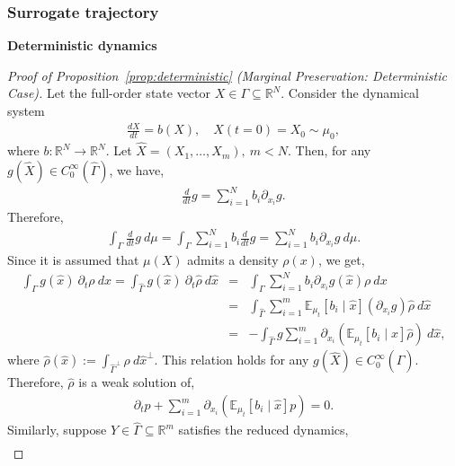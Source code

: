 \documentclass[11pt, a4paper, oneside, reqno]{amsart}
\begin{document}
\subsubsection{Surrogate trajectory}
\noindent\textbf{Deterministic dynamics}\label{app:proof x ode}

\begin{proof}[Proof of Proposition~\ref{prop:deterministic} (Marginal Preservation: Deterministic Case)]
    Let the full-order state vector $X\in\Gamma \subseteq \mathbb{R}^N$. Consider the dynamical system 
    \begin{eqnarray}
        \frac{dX}{dt} = b(X), \quad X(t=0) = X_0 \sim \mu_0,
    \end{eqnarray}
    where $b:\mathbb{R}^N\to\mathbb{R}^N$. Let $\hat{X}=(X_1,\dots,X_m), \ m<N$.
    Then, for any $g(\hat{X})\in C_0^\infty(\hat{\Gamma})$, we have,
    \begin{eqnarray}
        \frac{d}{dt}g = \sum_{i=1}^N b_i\partial_{x_i}g.
    \end{eqnarray}
    Therefore,
    \begin{eqnarray}
        \int_\Gamma \frac{d}{dt}g \ d\mu = \int_\Gamma \sum_{i=1}^N b_i        \frac{d}{dt}g = \sum_{i=1}^N b_i\partial_{x_i}g \ d\mu.
    \end{eqnarray}
    Since it is assumed that $\mu(X)$ admits a density $\rho(x)$, we get,
    \begin{eqnarray}
        \int_\Gamma g(\hat{x}) \ \partial_t\rho \ dx =  \int_{\hat{\Gamma}} g(\hat{x}) \ \partial_t\hat{\rho} \ d\hat{x} &=& \int_\Gamma \sum_{i=1}^N b_i\partial_{x_i}g(\hat{x}) \rho \ dx\nonumber\\
        &=&\int_{\hat{\Gamma}} \sum_{i=1}^m\mathbb{E}_{\mu_t}[b_i\mid \hat{x}] (\partial_{x_i}g) \hat{\rho}\ d\hat{x}\nonumber\\
        &=& -\int_{\hat{\Gamma}} g \sum_{i=1}^m\partial_{x_i}(\mathbb{E}_{\mu_t}[b_i\mid \hat{x}] \hat{\rho})\ d\hat{x},
    \end{eqnarray}
    where $\hat{\rho}(\hat{x}):=\int_{\hat{\Gamma}^\perp}\rho\ d\hat{x}^\perp$. This relation holds for any $g(\hat{X})\in C_0^\infty(\hat{\Gamma})$. Therefore, $\hat{\rho}$ is a weak solution of, 
    \begin{eqnarray}\label{eq:proba flow reference}
        \partial_tp+ \sum_{i=1}^m\partial_{x_i}(\mathbb{E}_{\mu_t}[b_i\mid \hat{x}] p)=0.
    \end{eqnarray}
    Similarly, suppose $Y\in\hat{\Gamma}\subseteq\mathbb{R}^m$ satisfies the reduced dynamics,
    \begin{eqnarray}

\end{eqnarray}
\end{proof}
\end{document}

